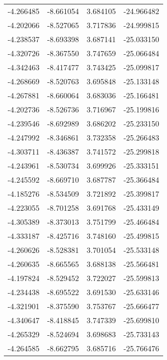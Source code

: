\begin{tabular}{rrrr}
       -4.266485 &        -8.661054 &    3.684105 & -24.966482 \\
       -4.202066 &        -8.527065 &    3.717836 & -24.999815 \\
       -4.238537 &        -8.693398 &    3.687141 & -25.033150 \\
       -4.320726 &        -8.367550 &    3.747659 & -25.066484 \\
       -4.342463 &        -8.417477 &    3.743425 & -25.099817 \\
       -4.268669 &        -8.520763 &    3.695848 & -25.133148 \\
       -4.267881 &        -8.660064 &    3.683036 & -25.166481 \\
       -4.202736 &        -8.526736 &    3.716967 & -25.199816 \\
       -4.239546 &        -8.692989 &    3.686202 & -25.233150 \\
       -4.247992 &        -8.346861 &    3.732358 & -25.266483 \\
       -4.303711 &        -8.436387 &    3.741572 & -25.299818 \\
       -4.243961 &        -8.530734 &    3.699926 & -25.333151 \\
       -4.245592 &        -8.669710 &    3.687787 & -25.366484 \\
       -4.185276 &        -8.534509 &    3.721892 & -25.399817 \\
       -4.223055 &        -8.701258 &    3.691768 & -25.433149 \\
       -4.305389 &        -8.373013 &    3.751799 & -25.466484 \\
       -4.333187 &        -8.425716 &    3.748160 & -25.499815 \\
       -4.260626 &        -8.528381 &    3.701054 & -25.533148 \\
       -4.260635 &        -8.665565 &    3.688138 & -25.566481 \\
       -4.197824 &        -8.529452 &    3.722027 & -25.599813 \\
       -4.234438 &        -8.695522 &    3.691530 & -25.633146 \\
       -4.321901 &        -8.375590 &    3.753767 & -25.666477 \\
       -4.340647 &        -8.418845 &    3.747339 & -25.699810 \\
       -4.265329 &        -8.524694 &    3.698683 & -25.733143 \\
       -4.264585 &        -8.662795 &    3.685716 & -25.766476 \\

\end{tabular}
